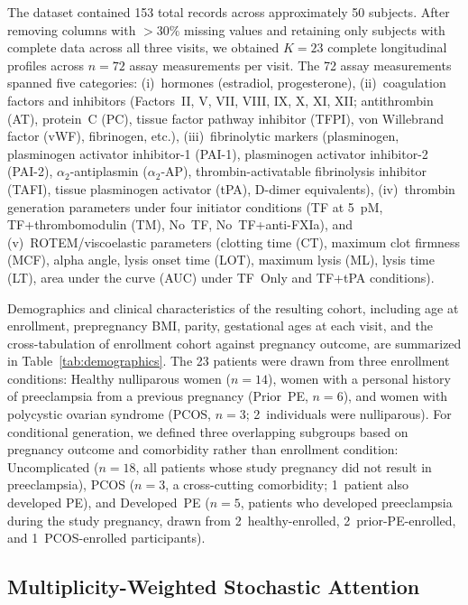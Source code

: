 The dataset contained 153 total records across approximately 50 subjects. After
removing columns with $>30\%$ missing values and retaining only subjects with
complete data across all three visits, we obtained $K=23$ complete longitudinal
profiles across $n=72$ assay measurements per visit.
The 72 assay measurements spanned five categories: (i)~hormones (estradiol,
progesterone), (ii)~coagulation factors and inhibitors (Factors~II, V, VII, VIII,
IX, X, XI, XII; antithrombin (AT), protein~C (PC), tissue factor pathway inhibitor (TFPI),
von Willebrand factor (vWF), fibrinogen, etc.), (iii)~fibrinolytic markers
(plasminogen, plasminogen activator inhibitor-1 (PAI-1), plasminogen activator inhibitor-2 (PAI-2),
$\alpha_2$-antiplasmin ($\alpha_2$-AP), thrombin-activatable fibrinolysis inhibitor (TAFI),
tissue plasminogen activator (tPA), D-dimer equivalents),
(iv)~thrombin generation parameters under four initiator conditions (TF at 5~pM,
TF+thrombomodulin (TM), No~TF, No~TF+anti-FXIa), and (v)~ROTEM/viscoelastic parameters
(clotting time (CT), maximum clot firmness (MCF),
alpha angle, lysis onset time (LOT), maximum lysis (ML), lysis time (LT),
area under the curve (AUC) under TF~Only and TF+tPA conditions).

Demographics and clinical characteristics of the resulting cohort, including
age at enrollment, prepregnancy BMI, parity, gestational ages at each visit,
and the cross-tabulation of enrollment cohort against pregnancy outcome, are
summarized in Table~\ref{tab:demographics}. The 23 patients were drawn from
three enrollment conditions: Healthy nulliparous women ($n{=}14$), women with
a personal history of preeclampsia from a previous pregnancy (Prior~PE,
$n{=}6$), and women with polycystic ovarian syndrome (PCOS, $n{=}3$;
2~individuals were nulliparous). For conditional generation, we defined three
overlapping subgroups based on pregnancy outcome and comorbidity rather than
enrollment condition: Uncomplicated ($n{=}18$, all patients whose study pregnancy
did not result in preeclampsia), PCOS ($n{=}3$, a cross-cutting comorbidity;
1~patient also developed PE), and Developed~PE ($n{=}5$, patients who developed
preeclampsia during the study pregnancy, drawn from 2~healthy-enrolled,
2~prior-PE-enrolled, and 1~PCOS-enrolled participants).


\subsection{Multiplicity-Weighted Stochastic Attention}
\label{sec:sa}

